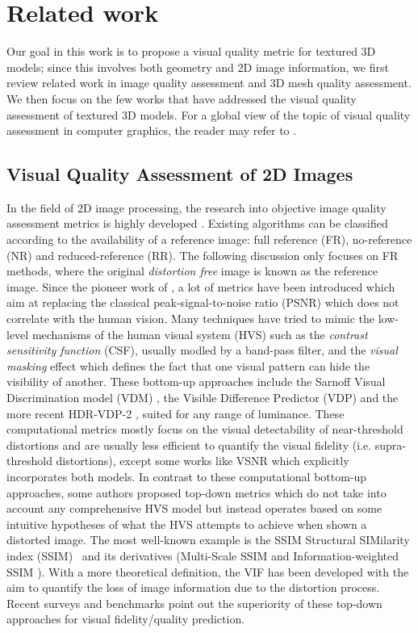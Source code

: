 \section{Related work}
Our goal in this work is to propose a visual quality metric for textured 3D models; since this involves both geometry and 2D image information, we first review related work in image quality assessment and 3D mesh quality assessment. We then focus on the few works that have addressed the visual quality assessment of textured 3D models. For a global view of the topic of visual quality assessment in computer graphics, the reader may refer to \cite{Lavoue2015}.

\subsection{Visual Quality Assessment of 2D Images}
In the field of 2D image processing, the research into objective image quality assessment metrics is highly developed \cite{Wang2006}. Existing algorithms can be classified according to the availability of a reference image: full reference (FR), no-reference (NR) and reduced-reference (RR). The following discussion only focuses on FR methods, where the original \textit{distortion free} image is known as the reference image. Since the pioneer work of \citet{Mannos_1974}, a lot of metrics have been introduced which aim at replacing the classical peak-signal-to-noise ratio (PSNR) which does not correlate with the human vision.
Many techniques have tried to mimic the low-level mechanisms of the human visual system (HVS) such as the \textit{contrast sensitivity function} (CSF), usually modled by a band-pass filter, and the \textit{visual masking} effect which defines the fact that one visual pattern can hide the visibility of another. These bottom-up approaches include the Sarnoff Visual Discrimination model (VDM) \cite{Lubin1993}, the Visible Difference Predictor (VDP) \cite{Daly1993} and the more recent HDR-VDP-2 \cite{Mantiuk2011}, suited for any range of luminance. These computational metrics mostly focus on the visual detectability of near-threshold distortions and are usually less efficient to quantify the visual fidelity (i.e. supra-threshold distortions), except some works like VSNR \cite{Chandler2007} which explicitly incorporates both models. 
In contrast to these computational bottom-up approaches, some authors proposed top-down metrics which do not take into account any comprehensive HVS model but instead operates based on some intuitive hypotheses of what the HVS attempts to achieve when shown a distorted image. The most well-known example is the SSIM Structural SIMilarity index (SSIM)~\cite{Wang_2004} and its derivatives (Multi-Scale SSIM \cite{Wanga} and Information-weighted SSIM \cite{Zhou_Wang_2011}). With a more theoretical definition, the VIF \cite{Sheikh2006} has been developed with the aim to quantify the loss of image information due to the distortion process. Recent surveys and benchmarks \cite{Zhang2012} point out the superiority of these top-down approaches for visual fidelity/quality prediction.


